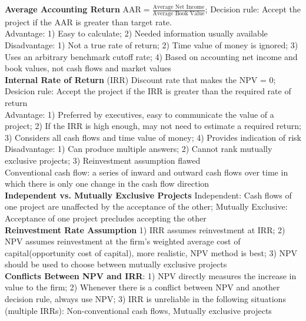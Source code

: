 \documentclass[12pt,landscape, a4paper]{article}
\theoremstyle{remark}
\begin{document}
\begin{multicols*}{3}
\textbf{Average Accounting Return} $\mathrm{AAR} = \frac{\text{Average Net Income}}{\text{Average Book Value}}$; Decision rule: Accept the project if the AAR is greater than target rate.\\
Advantage: 1) Easy to calculate; 2) Needed information usually available\\
Disadvantage: 1) Not a true rate of return; 2) Time value of money is ignored; 3) Uses an arbitrary benchmark cutoff rate; 4) Based on accounting net income and book values, not cash flows and market values\\

\textbf{Internal Rate of Return} (IRR) Discount rate that makes the NPV = 0; Desicion rule: Accept the project if the IRR is greater than the required rate of return\\
Advantage: 1) Preferred by executives, easy to communicate the value of a project; 2) If the IRR is high enough, may not need to estimate a required return; 3) Considers all cash flows and time value of money; 4) Provides indication of risk\\
Disadvantage: 1) Can produce multiple answers; 2) Cannot rank mutually exclusive projects; 3) Reinvestment assumption flawed\\
Conventional cash flow: a series of inward and outward cash flows over time in which there is only one change in the cash flow direction\\
\textbf{Independent vs. Mutually Exclusive Projects} Independent: Cash flows of one project are unaffected by the acceptance of the other; Mutually Exclusive: Acceptance of one project precludes accepting the other\\
\textbf{Reinvestment Rate Assumption} 1) IRR assumes reinvestment at IRR; 2) NPV assumes reinvestment at the firm’s weighted average cost of capital(opportunity cost of capital), more realistic, NPV method is best; 3) NPV should be used to choose between mutually exclusive projects\\

\textbf{Conflicts Between NPV and IRR}: 1) NPV directly measures the increase in value to the firm; 2) Whenever there is a conflict between NPV and another decision rule, always use NPV; 3) IRR is unreliable in the following situations (multiple IRRs): Non-conventional cash flows, Mutually exclusive projects\\


\end{multicols*}
\end{document}
